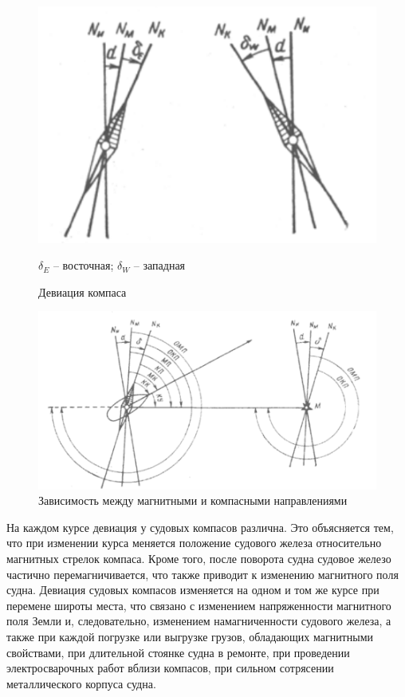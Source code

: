 \documentclass[a4paper, 12pt, twoside, final, book, russian, fittopage, cyremdash]{ncc}
\begin{document}
\begin{figure}[htb]
  \centering{}
  \includegraphics{N012}
  \caption{Девиация компаса}
  \label{fig:N12}
  \small
  \centering{}
  $\delta_E$ \--- восточная; $\delta_W$ \--- западная
\end{figure}

\begin{figure}[htb]
  \centering{}
  \includegraphics{N013}
  \caption{Зависимость между магнитными и компасными направлениями}
  \label{fig:N13}
\end{figure}

На каждом курсе девиация у судовых компасов различна. Это объясняется тем, что при изменении курса меняется положение судового железа относительно магнитных стрелок компаса. Кроме того, после поворота судна судовое железо частично перемагничивается, что также приводит к изменению магнитного поля судна. Девиация судовых компасов изменяется на одном и том же курсе при перемене широты места, что связано с изменением напряженности магнитного поля Земли и, следовательно, изменением намагниченности судового железа, а также при каждой погрузке или выгрузке грузов, обладающих магнитными свойствами, при длительной стоянке судна в ремонте, при проведении электросварочных работ вблизи компасов, при сильном сотрясении металлического корпуса судна. 
\end{document}

